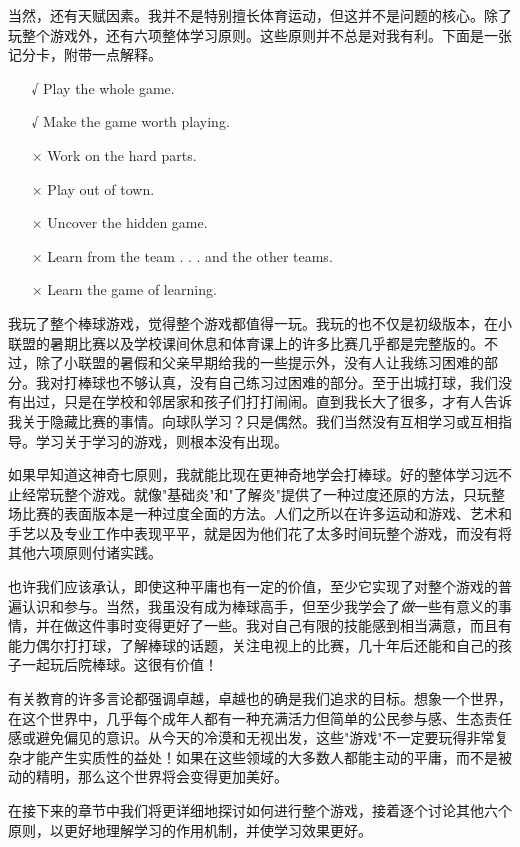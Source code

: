 当然，还有天赋因素。我并不是特别擅长体育运动，但这并不是问题的核心。除了玩整个游戏外，还有六项整体学习原则。这些原则并不总是对我有利。下面是一张记分卡，附带一点解释。
\begin{itemize}
\item[√] Play the whole game.
\item[√] Make the game worth playing.
\item[×] Work on the hard parts.
\item[×] Play out of town.
\item[×] Uncover the hidden game.
\item[×] Learn from the team . . . and the other teams. 
\item[×] Learn the game of learning.
\end{itemize}

我玩了整个棒球游戏，觉得整个游戏都值得一玩。我玩的也不仅是初级版本，在小联盟的暑期比赛以及学校课间休息和体育课上的许多比赛几乎都是完整版的。不过，除了小联盟的暑假和父亲早期给我的一些提示外，没有人让我练习困难的部分。我对打棒球也不够认真，没有自己练习过困难的部分。至于出城打球，我们没有出过，只是在学校和邻居家和孩子们打打闹闹。直到我长大了很多，才有人告诉我关于隐藏比赛的事情。向球队学习？只是偶然。我们当然没有互相学习或互相指导。学习关于学习的游戏，则根本没有出现。

如果早知道这神奇七原则，我就能比现在更神奇地学会打棒球。好的整体学习远不止经常玩整个游戏。就像"基础炎"和"了解炎"提供了一种过度还原的方法，只玩整场比赛的表面版本是一种过度全面的方法。人们之所以在许多运动和游戏、艺术和手艺以及专业工作中表现平平，就是因为他们花了太多时间玩整个游戏，而没有将其他六项原则付诸实践。

也许我们应该承认，即使这种平庸也有一定的价值，至少它实现了对整个游戏的普遍认识和参与。当然，我虽没有成为棒球高手，但至少我学会了\textit{做}一些有意义的事情，并在做这件事时变得更好了一些。我对自己有限的技能感到相当满意，而且有能力偶尔打打球，了解棒球的话题，关注电视上的比赛，几十年后还能和自己的孩子一起玩后院棒球。这很有价值！

有关教育的许多言论都强调卓越，卓越也的确是我们追求的目标。想象一个世界，在这个世界中，几乎每个成年人都有一种充满活力但简单的公民参与感、生态责任感或避免偏见的意识。从今天的冷漠和无视出发，这些"游戏"不一定要玩得非常复杂才能产生实质性的益处！如果在这些领域的大多数人都能主动的平庸，而不是被动的精明，那么这个世界将会变得更加美好。

在接下来的章节中我们将更详细地探讨如何进行整个游戏，接着逐个讨论其他六个原则，以更好地理解学习的作用机制，并使学习效果更好。